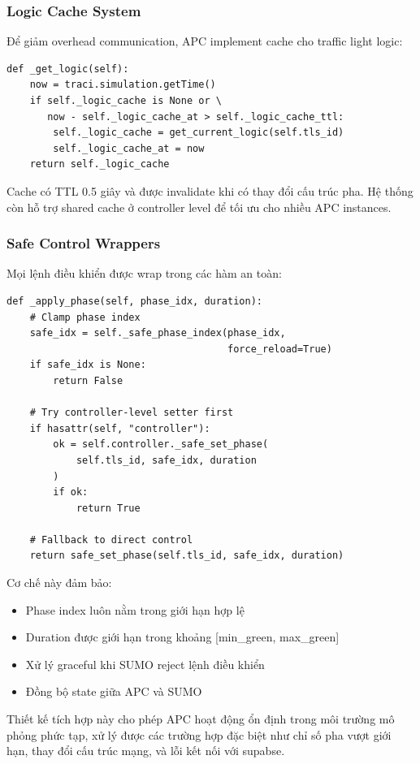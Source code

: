 \subsubsection{Logic Cache System}
Để giảm overhead communication, APC implement cache cho traffic light logic:

\begin{lstlisting}[style=py, caption={Cơ chế cache logic}]
def _get_logic(self):
    now = traci.simulation.getTime()
    if self._logic_cache is None or \
       now - self._logic_cache_at > self._logic_cache_ttl:
        self._logic_cache = get_current_logic(self.tls_id)
        self._logic_cache_at = now
    return self._logic_cache
\end{lstlisting}

Cache có TTL 0.5 giây và được invalidate khi có thay đổi cấu trúc pha. Hệ thống còn hỗ trợ shared cache ở controller level để tối ưu cho nhiều APC instances.

\subsubsection{Safe Control Wrappers}
Mọi lệnh điều khiển được wrap trong các hàm an toàn:

\begin{lstlisting}[style=py, caption={Safe phase control}]
def _apply_phase(self, phase_idx, duration):
    # Clamp phase index
    safe_idx = self._safe_phase_index(phase_idx, 
                                      force_reload=True)
    if safe_idx is None:
        return False
    
    # Try controller-level setter first
    if hasattr(self, "controller"):
        ok = self.controller._safe_set_phase(
            self.tls_id, safe_idx, duration
        )
        if ok:
            return True
            
    # Fallback to direct control
    return safe_set_phase(self.tls_id, safe_idx, duration)
\end{lstlisting}

Cơ chế này đảm bảo:
\begin{itemize}
    \item Phase index luôn nằm trong giới hạn hợp lệ
    \item Duration được giới hạn trong khoảng [min\_green, max\_green]
    \item Xử lý graceful khi SUMO reject lệnh điều khiển
    \item Đồng bộ state giữa APC và SUMO
\end{itemize}
Thiết kế tích hợp này cho phép APC hoạt động ổn định trong môi trường mô phỏng phức tạp, xử lý được các trường hợp đặc biệt như chỉ số pha vượt giới hạn, thay đổi cấu trúc mạng, và lỗi kết nối với supabse.
